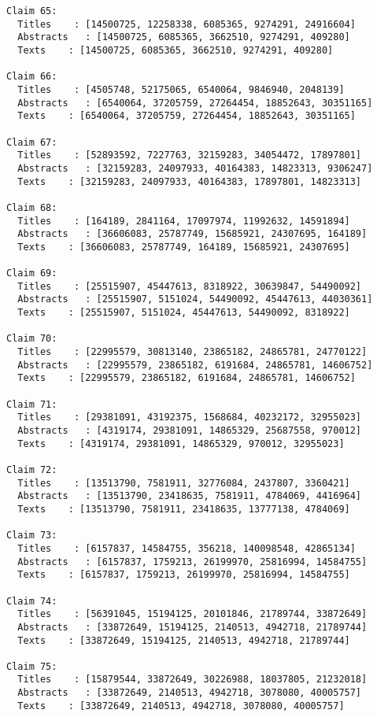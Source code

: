 \documentclass[11pt]{article}
\begin{document}
\begin{Verbatim}[commandchars=\\\{\}]
Claim 65:
  Titles    : [14500725, 12258338, 6085365, 9274291, 24916604]
  Abstracts   : [14500725, 6085365, 3662510, 9274291, 409280]
  Texts    : [14500725, 6085365, 3662510, 9274291, 409280]

Claim 66:
  Titles    : [4505748, 52175065, 6540064, 9846940, 2048139]
  Abstracts   : [6540064, 37205759, 27264454, 18852643, 30351165]
  Texts    : [6540064, 37205759, 27264454, 18852643, 30351165]

Claim 67:
  Titles    : [52893592, 7227763, 32159283, 34054472, 17897801]
  Abstracts   : [32159283, 24097933, 40164383, 14823313, 9306247]
  Texts    : [32159283, 24097933, 40164383, 17897801, 14823313]

Claim 68:
  Titles    : [164189, 2841164, 17097974, 11992632, 14591894]
  Abstracts   : [36606083, 25787749, 15685921, 24307695, 164189]
  Texts    : [36606083, 25787749, 164189, 15685921, 24307695]

Claim 69:
  Titles    : [25515907, 45447613, 8318922, 30639847, 54490092]
  Abstracts   : [25515907, 5151024, 54490092, 45447613, 44030361]
  Texts    : [25515907, 5151024, 45447613, 54490092, 8318922]

Claim 70:
  Titles    : [22995579, 30813140, 23865182, 24865781, 24770122]
  Abstracts   : [22995579, 23865182, 6191684, 24865781, 14606752]
  Texts    : [22995579, 23865182, 6191684, 24865781, 14606752]

Claim 71:
  Titles    : [29381091, 43192375, 1568684, 40232172, 32955023]
  Abstracts   : [4319174, 29381091, 14865329, 25687558, 970012]
  Texts    : [4319174, 29381091, 14865329, 970012, 32955023]

Claim 72:
  Titles    : [13513790, 7581911, 32776084, 2437807, 3360421]
  Abstracts   : [13513790, 23418635, 7581911, 4784069, 4416964]
  Texts    : [13513790, 7581911, 23418635, 13777138, 4784069]

Claim 73:
  Titles    : [6157837, 14584755, 356218, 140098548, 42865134]
  Abstracts   : [6157837, 1759213, 26199970, 25816994, 14584755]
  Texts    : [6157837, 1759213, 26199970, 25816994, 14584755]

Claim 74:
  Titles    : [56391045, 15194125, 20101846, 21789744, 33872649]
  Abstracts   : [33872649, 15194125, 2140513, 4942718, 21789744]
  Texts    : [33872649, 15194125, 2140513, 4942718, 21789744]

Claim 75:
  Titles    : [15879544, 33872649, 30226988, 18037805, 21232018]
  Abstracts   : [33872649, 2140513, 4942718, 3078080, 40005757]
  Texts    : [33872649, 2140513, 4942718, 3078080, 40005757]


\end{Verbatim}
\end{document}
